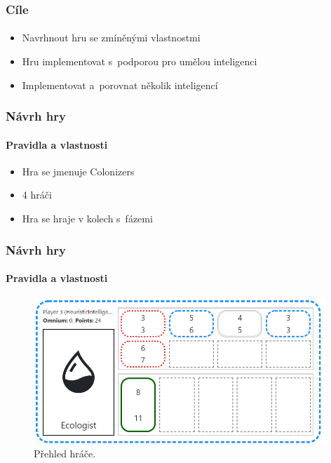 \documentclass[c, 10pt]{beamer}
\begin{document}
\begin{frame}\frametitle{Cíle}
\framesubtitle{}

    \begin{itemize}\itemsep=1em
        \item Navrhnout hru se zmíněnými vlastnostmi
        \item Hru implementovat s~podporou pro umělou inteligenci
        \item Implementovat a~porovnat několik inteligencí
    \end{itemize}
\end{frame}

\begin{frame}\frametitle{Návrh hry}
\framesubtitle{Pravidla a vlastnosti}
    
    \begin{itemize}\itemsep=1em
        \item Hra se jmenuje \alert{Colonizers}
        \item 4 hráči
        \item Hra se hraje v kolech s~fázemi
    \end{itemize}
\end{frame}

\begin{frame}\frametitle{Návrh hry}
\framesubtitle{Pravidla a vlastnosti}
    \begin{figure}[ht]
        \centerline{\mbox{\includegraphics[width=110mm]{player}}}
        \caption{Přehled hráče.}\label{ud:player}
    \end{figure}
\end{frame}
\end{document}
